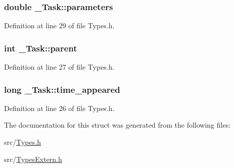 \hypertarget{struct___task_ab8513f93ddd80bfbc5f9e30d931d0650}{}
\subsubsection[{parameters}]{\setlength{\rightskip}{0pt plus 5cm}double \+\_\+\+Task\+::parameters}\label{struct___task_ab8513f93ddd80bfbc5f9e30d931d0650}


Definition at line 29 of file Types.\+h.

\hypertarget{struct___task_abeed33dfd888cd92c22842de87158721}{}
\subsubsection[{parent}]{\setlength{\rightskip}{0pt plus 5cm}int \+\_\+\+Task\+::parent}\label{struct___task_abeed33dfd888cd92c22842de87158721}


Definition at line 27 of file Types.\+h.

\hypertarget{struct___task_af6627e17a6012b29392f3decfcc52c99}{}
\subsubsection[{time\+\_\+appeared}]{\setlength{\rightskip}{0pt plus 5cm}long \+\_\+\+Task\+::time\+\_\+appeared}\label{struct___task_af6627e17a6012b29392f3decfcc52c99}


Definition at line 26 of file Types.\+h.



The documentation for this struct was generated from the following files\+:\begin{DoxyCompactItemize}
\item 
src/\hyperlink{_types_8h}{Types.\+h}\item 
src/\hyperlink{_types_extern_8h}{Types\+Extern.\+h}\end{DoxyCompactItemize}
